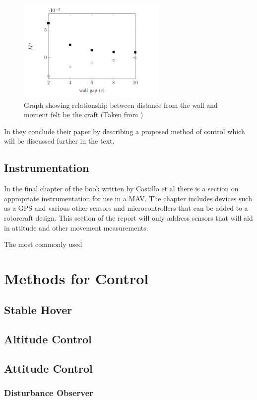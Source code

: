 \begin{figure}[H]
\centering
\includegraphics[height = 5cm]{Images/Literature/NearWallGraph}     
\caption{Graph showing relationship between distance from the wall and moment felt be the craft (Taken from \cite{NearWall})}
\label{IM_NearWallGraph}
\end{figure}

In \cite{NearWall} they conclude their paper by describing a proposed method of control which will be discussed further in the text.

\subsection{Instrumentation}
In the final chapter of the book written by Castillo et al \cite{MiniFlying} there is a section on appropriate instrumentation for use in a MAV. The chapter includes devices such as a GPS and various other sensors and microcontrollers that can be added to a rotorcraft design. This section of the report will only address sensors that will aid in attitude and other movement measurements.

The most commonly used


\section{Methods for Control}
\subsection{Stable Hover}
\subsection{Altitude Control}
\subsection{Attitude Control}
\subsubsection{Disturbance Observer}

